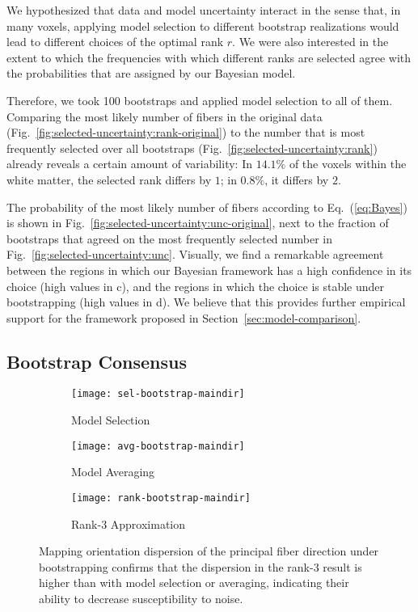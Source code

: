 We hypothesized that data and model uncertainty interact in the sense that, in many voxels, applying model selection to different bootstrap realizations would lead to different choices of the optimal rank $r$. We were also interested in the extent to which the frequencies with which different ranks are selected agree with the probabilities that are assigned by our Bayesian model.

Therefore, we took 100 bootstraps and applied model
selection to all of them. Comparing the most
likely number of fibers in the original data (Fig.~\ref{fig:selected-uncertainty:rank-original}) to the number that is most frequently selected over all bootstraps (Fig.~\ref{fig:selected-uncertainty:rank}) already reveals a certain amount of variability: In $14.1\%$ of the voxels within the white matter, the selected rank differs
by $1$; in $0.8\%$, it differs by $2$.

The probability of the most likely number of fibers according to Eq.~(\ref{eq:Bayes}) is
shown in Fig.~\ref{fig:selected-uncertainty:unc-original}, next to the fraction of bootstraps that agreed on the most frequently selected number in Fig.~\ref{fig:selected-uncertainty:unc}. Visually, we find a remarkable agreement between the regions in which our Bayesian framework has a high confidence in its choice (high values in c), and the regions in which the choice is stable under bootstrapping (high values in d). We believe that this provides further empirical support for the framework proposed in Section~\ref{sec:model-comparison}.

\subsection{Bootstrap Consensus}
\label{sec:bootstrap-consensus}
\begin{figure*}[t]
	\centering
	\begin{subfigure}[b]{0.32\linewidth}
		\texttt{[image: sel-bootstrap-maindir]}
		\caption{Model Selection}
		
	\end{subfigure}
        \hspace{0.01\linewidth}
	\begin{subfigure}[b]{0.32\linewidth}
		\texttt{[image: avg-bootstrap-maindir]}
		\caption{Model Averaging}
	\end{subfigure}
        \hspace{0.01\linewidth}
	\begin{subfigure}[b]{0.32\linewidth}
		\texttt{[image: rank-bootstrap-maindir]}
		\caption{Rank-3 Approximation}
	\end{subfigure}

	\caption{Mapping orientation dispersion of the principal fiber
		direction under bootstrapping confirms that the dispersion in the rank-$3$
result is higher than with model selection or averaging, indicating their ability to decrease susceptibility to noise.}
	\label{fig:dispersion}
\end{figure*}

